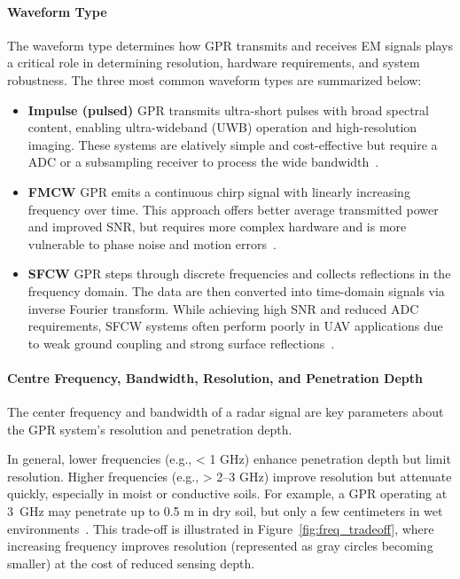 \paragraph{Waveform Type}

The waveform type determines how \gls{GPR} transmits and receives \gls{EM} signals plays a critical role in determining resolution, hardware requirements, and system robustness. The three most common waveform types are summarized below:

\begin{itemize}
    \item \textbf{Impulse (pulsed)} \gls{GPR} transmits ultra-short pulses with broad spectral content, enabling ultra-wideband (UWB) operation and high-resolution imaging. These systems are elatively simple and cost-effective but require a \gls{ADC} or a subsampling receiver to process the wide bandwidth~\cite{chen2023ground,sipos2017drone}.

    \item \textbf{\gls{FMCW}} \gls{GPR} emits a continuous chirp signal with linearly increasing frequency over time. This approach offers better average transmitted power and improved \gls{SNR}, but requires more complex hardware and is more vulnerable to phase noise and motion errors~\cite{burr2018design}.
    
    \item \textbf{\gls{SFCW}} \gls{GPR} steps through discrete frequencies and collects reflections in the frequency domain. The data are then converted into time-domain signals via inverse Fourier transform. While achieving high \gls{SNR} and reduced \gls{ADC} requirements, \gls{SFCW} systems often perform poorly in \gls{UAV} applications due to weak ground coupling and strong surface reflections~\cite{tronca2018comparison}.
\end{itemize}


\paragraph{Centre Frequency, Bandwidth, Resolution, and Penetration Depth}

The center frequency and bandwidth of a radar signal are key parameters about the \gls{GPR} system’s resolution and penetration depth. 

In general, lower frequencies (e.g., < 1 GHz) enhance penetration depth but limit resolution. Higher frequencies (e.g., > 2--3 GHz) improve resolution but attenuate quickly, especially in moist or conductive soils. For example, a \gls{GPR} operating at 3~GHz may penetrate up to 0.5 m in dry soil, but only a few centimeters in wet environments~\cite{alqudsi2021review}. This trade-off is illustrated in Figure~\ref{fig:freq_tradeoff}, where increasing frequency improves resolution (represented as gray circles becoming smaller) at the cost of reduced sensing depth.

